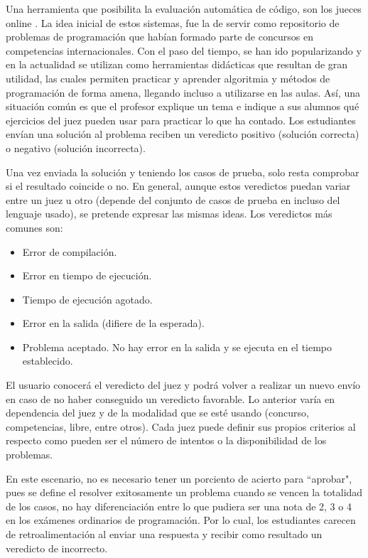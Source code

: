 \documentclass[a4paper,openright,11pt,oneside]{book}
\begin{document}
	Una herramienta que posibilita la evaluación automática de código, son los jueces online \cite{hernandez2017feedback}. La idea inicial de estos sistemas, fue la de servir como repositorio de problemas de programación que habían formado parte de concursos en competencias internacionales. Con el paso del tiempo, se han ido popularizando y en la actualidad se utilizan como herramientas didácticas que resultan de gran utilidad, las cuales permiten practicar y aprender algoritmia y métodos de programación de forma amena, llegando incluso a utilizarse en las aulas. Así, una situación común es que el profesor explique un tema e indique a sus alumnos qué ejercicios del juez pueden usar para practicar lo que ha contado. Los estudiantes envían una solución al problema reciben un veredicto positivo (solución correcta) o negativo (solución incorrecta).
	
	Una vez enviada la solución y teniendo los casos de prueba, solo resta comprobar si el resultado coincide o no. En general, aunque estos veredictos puedan variar entre un juez u otro (depende del conjunto de casos de prueba en incluso del lenguaje usado), se pretende expresar las mismas ideas. Los veredictos más comunes son:
	
	\begin{itemize}
		\item Error de compilación.
		
		\item Error en tiempo de ejecución.
		
		\item Tiempo de ejecución agotado.
		
		\item Error en la salida (difiere de la esperada).
		
		\item Problema aceptado. No hay error en la salida y se ejecuta en el tiempo establecido.
	\end{itemize}

	El usuario conocerá el veredicto del juez y podrá volver a realizar un  nuevo  envío  en  caso  de  no  haber  conseguido  un  veredicto  favorable. Lo anterior varía en dependencia del juez y de la modalidad que se esté usando (concurso, competencias, libre, entre otros). Cada juez puede  definir  sus  propios  criterios  al  respecto como pueden ser el número de intentos o la disponibilidad de los problemas.
	
	En este escenario, no es necesario tener un porciento de acierto para ``aprobar", pues se define el resolver exitosamente un problema cuando se vencen la totalidad de los casos, no hay diferenciación entre lo que pudiera ser una nota de 2, 3 o 4 en los exámenes ordinarios de programación. Por lo cual, los estudiantes carecen de retroalimentación al enviar una respuesta y recibir como resultado un veredicto de incorrecto.  \\
	
\end{document}
